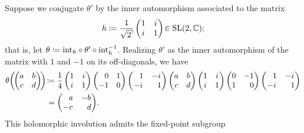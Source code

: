\begin{example}
\noindent Suppose we conjugate $\theta'$ by the inner automorphism associated to the matrix
\begin{align*}
\begin{split}
h \coloneqq \frac{1}{\csqrt{2}}\begin{pmatrix}1&i\\i&1\end{pmatrix}\! \in \textnormal{SL}(2, \mathbb{C});
\end{split}
\end{align*}
\noindent that is, let $\theta \coloneqq \textnormal{int}_h\circ\theta'\circ\textnormal{int}_h^{-1}$. Realizing $\theta'$ as the inner automorphism of the matrix with $1$ and $-1$ on its off-diagonals, we have
\begin{align*}
\begin{split}
\theta\!\left(\!\begin{pmatrix}a&b\\c&d\end{pmatrix}\!\right)\! &\coloneqq \frac{1}{4}\begin{pmatrix}1&i\\i&1\end{pmatrix}\begin{pmatrix}\hphantom{-}0&1\\-1&0\end{pmatrix}\begin{pmatrix}\hphantom{-}1&-i\\-i&\hphantom{-}1\end{pmatrix}\begin{pmatrix}a&b\\c&d\end{pmatrix}\begin{pmatrix}1&i\\i&1\end{pmatrix}\begin{pmatrix}0&-1\\1&\hphantom{-}0\end{pmatrix}\begin{pmatrix}\hphantom{-}1&-i\\-i&\hphantom{-}1\end{pmatrix}\\
&\hphantom{\coloneqq}\nhphantom{=}= \begin{pmatrix}\hphantom{-}a&-b\\-c&\hphantom{-}d\end{pmatrix}\!.
\end{split}
\end{align*}
\noindent This holomorphic involution admits the fixed-point subgroup

\end{example}
